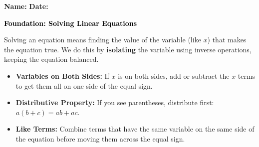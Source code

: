 \documentclass[12pt, letterpaper, fleqn]{article}
\begin{document}
\textbf{Name:} \underline{\hspace{5cm}}
\hfill
\textbf{Date:} \underline{\hspace{3cm}}\\

\begin{tcolorbox}[colback=customteal!20]
    \large\textcolor{black}{\textbf{Foundation: Solving Linear Equations}}
\end{tcolorbox}

\vspace{3mm}

\noindent
Solving an equation means finding the value of the variable (like $x$) that makes the equation true. We do this by \textbf{isolating} the variable using inverse operations, keeping the equation balanced.

\begin{itemize}
    \item \textbf{Variables on Both Sides:} If $x$ is on both sides, add or subtract the $x$ terms to get them all on one side of the equal sign.
    \item \textbf{Distributive Property:} If you see parentheses, distribute first: $a(b + c) = ab + ac$.
    \item \textbf{Like Terms:} Combine terms that have the same variable on the same side of the equation before moving them across the equal sign.
\end{itemize}

\vspace{4mm}
\end{document}
